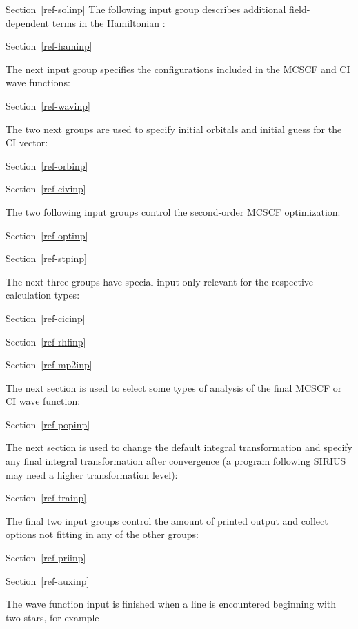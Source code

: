 Section~\ref{ref-solinp} 
\else
The following input group describes additional field-dependent
terms in the Hamiltonian :
 
Section~\ref{ref-haminp} 
\fi
 
\noindent
The next input group specifies the configurations included
in the MCSCF and CI wave functions:
 
Section~\ref{ref-wavinp} 
 
\noindent
The two next groups are used to specify initial orbitals and initial
guess for the CI vector:
 
Section~\ref{ref-orbinp} 
 
Section~\ref{ref-civinp} 
 
\noindent
The two following input groups control the second-order MCSCF
optimization:
 
Section~\ref{ref-optinp} 
 
Section~\ref{ref-stpinp} 
 
\noindent
The next three groups have special input only relevant for the
respective calculation types:
 
Section~\ref{ref-cicinp} 
 
Section~\ref{ref-rhfinp} 
 
Section~\ref{ref-mp2inp} 
 
\noindent
The next section is used to select some types of analysis of the final
MCSCF or CI wave function:
 
Section~\ref{ref-popinp} 
 
\noindent
The next section is used to change the default integral transformation
and specify any final integral transformation after convergence (a
program following SIRIUS may need a higher transformation level):
 
Section~\ref{ref-trainp} 
 
\noindent
The final two input groups control the amount of printed output and
collect options not fitting in any of the other groups:
 
Section~\ref{ref-priinp} 
 
Section~\ref{ref-auxinp} 
 
\bigskip
\noindent
The wave function input is finished when a line is encountered beginning
with two stars, for example
 

